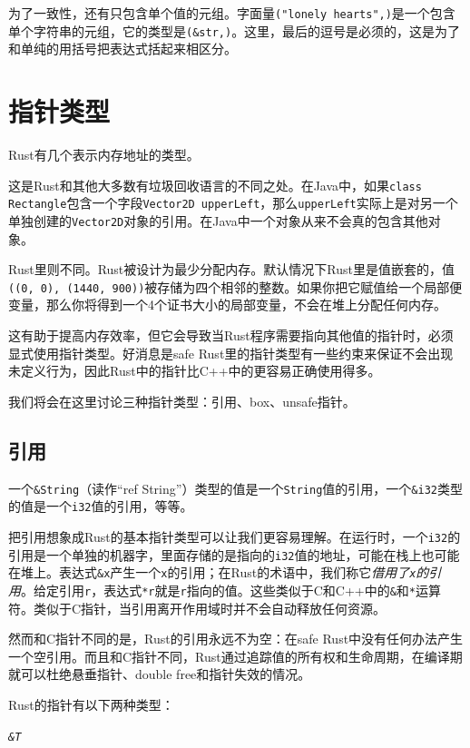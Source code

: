 为了一致性，还有只包含单个值的元组。字面量\texttt{("lonely hearts",)}是一个包含单个字符串的元组，它的类型是\texttt{(\&str,)}。这里，最后的逗号是必须的，这是为了和单纯的用括号把表达式括起来相区分。

\section{指针类型}
Rust有几个表示内存地址的类型。

这是Rust和其他大多数有垃圾回收语言的不同之处。在Java中，如果\texttt{class Rectangle}包含一个字段\texttt{Vector2D upperLeft}，那么\texttt{upperLeft}实际上是对另一个单独创建的\texttt{Vector2D}对象的引用。在Java中一个对象从来不会真的包含其他对象。

Rust里则不同。Rust被设计为最少分配内存。默认情况下Rust里是值嵌套的，值\texttt{((0, 0), (1440, 900))}被存储为四个相邻的整数。如果你把它赋值给一个局部便变量，那么你将得到一个4个证书大小的局部变量，不会在堆上分配任何内存。

这有助于提高内存效率，但它会导致当Rust程序需要指向其他值的指针时，必须显式使用指针类型。好消息是safe Rust里的指针类型有一些约束来保证不会出现未定义行为，因此Rust中的指针比C++中的更容易正确使用得多。

我们将会在这里讨论三种指针类型：引用、box、unsafe指针。

\subsection{引用}

一个\texttt{\&String}（读作“ref String”）类型的值是一个\texttt{String}值的引用，一个\texttt{\&i32}类型的值是一个\texttt{i32}值的引用，等等。

把引用想象成Rust的基本指针类型可以让我们更容易理解。在运行时，一个\texttt{i32}的引用是一个单独的机器字，里面存储的是指向的\texttt{i32}值的地址，可能在栈上也可能在堆上。表达式\texttt{\&x}产生一个\texttt{x}的引用；在Rust的术语中，我们称它\emph{借用了\texttt{x}的引用}。给定引用\texttt{r}，表达式\texttt{*r}就是\texttt{r}指向的值。这些类似于C和C++中的\texttt{\&}和\texttt{*}运算符。类似于C指针，当引用离开作用域时并不会自动释放任何资源。

然而和C指针不同的是，Rust的引用永远不为空：在safe Rust中没有任何办法产生一个空引用。而且和C指针不同，Rust通过追踪值的所有权和生命周期，在编译期就可以杜绝悬垂指针、double free和指针失效的情况。

Rust的指针有以下两种类型：
\begin{flushleft}
    \emph{\texttt{\&T}}
\end{flushleft}

